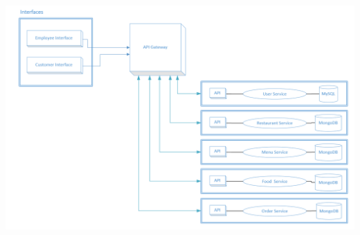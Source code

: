 \documentclass[12pt]{article}
\newenvironment{Figure}
	{\par\medskip\noindent\minipage{\linewidth}}
	{\endminipage\par\medskip}
\begin{document}
\begin{Figure}
	\includegraphics[width=\linewidth]{illustrations/Finalapp.png}
	\label{fig:applicationdiagram}
\end{Figure}
\end{document}
